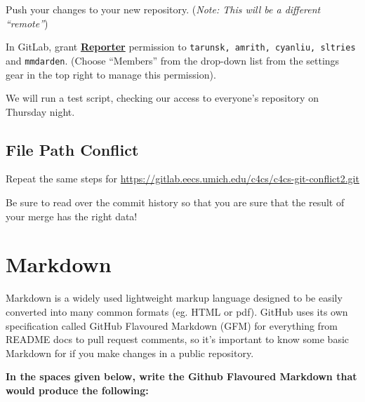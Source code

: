 \documentclass{article}
\begin{document}
Push your changes to your new repository. (\emph{\small Note: This will be a
  different ``remote''})

In GitLab, grant \textbf{\ul{Reporter}} permission to \texttt{tarunsk, amrith, 
cyanliu, sltries} and \texttt{mmdarden}.
(Choose ``Members'' from the drop-down list from the settings gear in the top
right to manage this permission).

We will run a test script, checking our access to everyone's repository on
Thursday night.

\subsection{File Path Conflict}

Repeat the same steps for
\url{https://gitlab.eecs.umich.edu/c4cs/c4cs-git-conflict2.git}

Be sure to read over the commit history so that you are sure that the result
of your merge has the right data!

\newpage
\section{Markdown}

Markdown is a widely used lightweight markup language designed to be easily
converted into many common formats (eg. HTML or pdf). GitHub uses its own 
specification called GitHub Flavoured Markdown (GFM) for everything from README 
docs to pull request comments, so it's important to know some basic Markdown for 
if you make changes in a public repository.

\textbf{In the spaces given below, write the Github Flavoured Markdown that would 
produce the following:} \\
\end{document}
